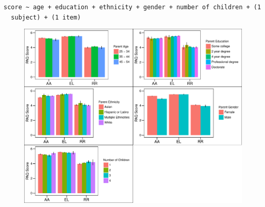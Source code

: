 \documentclass[floatsintext,man]{apa6}
\theoremstyle{definition}
\theoremstyle{definition}
\theoremstyle{definition}
\theoremstyle{remark}
\begin{document}
\texttt{score\ \textasciitilde{}\ age\ +\ education\ +\ ethnicity\ +\ gender\ +\ number\ of\ children\ +\ (1\ \textbar{}\ subject)\ +\ (1\textbar{}\ item)}

\begin{figure}
\centering
\includegraphics{PAQ_paper_files/figure-latex/unnamed-chunk-11-1.pdf}
\caption{}
\end{figure}
\end{document}
